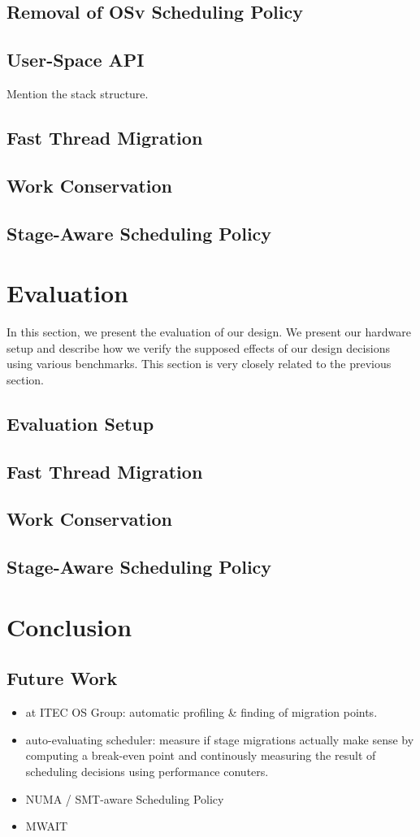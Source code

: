 \documentclass[12pt,a4paper]{article}
\begin{document}
\subsection{Removal of OSv Scheduling Policy}
\subsection{User-Space API}
Mention the stack structure.
\subsection{Fast Thread Migration}
\subsection{Work Conservation}
\subsection{Stage-Aware Scheduling Policy}

\clearpage
\section{Evaluation}
In this section, we present the evaluation of our design.
We present our hardware setup and describe how we verify the supposed effects of our design decisions using various benchmarks.
This section is very closely related to the previous section.
\subsection{Evaluation Setup}
\subsection{Fast Thread Migration}
\subsection{Work Conservation}
\subsection{Stage-Aware Scheduling Policy}

\section{Conclusion}
\subsection{Future Work}
\begin{itemize}
    \item at ITEC OS Group: automatic profiling \& finding of migration points.
    \item auto-evaluating scheduler: measure if stage migrations actually make sense by computing a break-even point and continously measuring the result of scheduling decisions using performance conuters.
    \item NUMA / SMT-aware Scheduling Policy
    \item MWAIT
\end{itemize}
\end{document}
